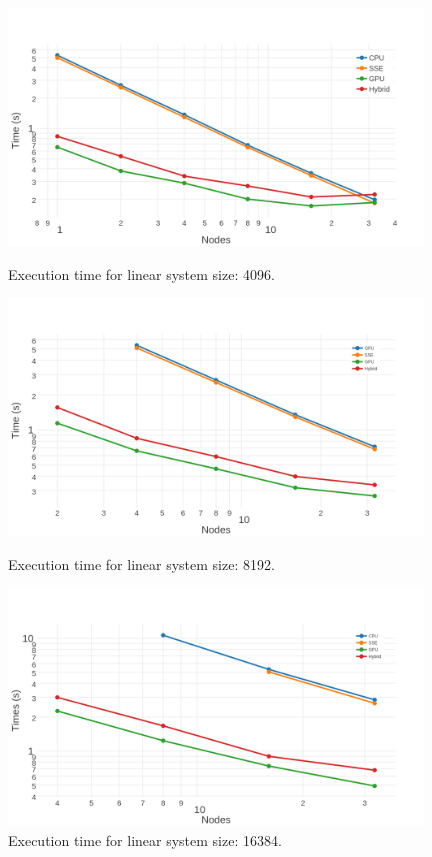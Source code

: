 \begin{figure}
   \centering
   \includegraphics[width=11cm]{Plots/4096.png}
   \caption{Execution time for linear system size: 4096.} \label{plot:bench-4096}

   \includegraphics[width=11cm]{Plots/8192.png}
   \caption{Execution time for linear system size: 8192.} \label{plot:bench-8192}

   \includegraphics[width=11cm]{Plots/16384.png}
   \caption{Execution time for linear system size: 16384.} \label{plot:bench-16384}
\end{figure}
